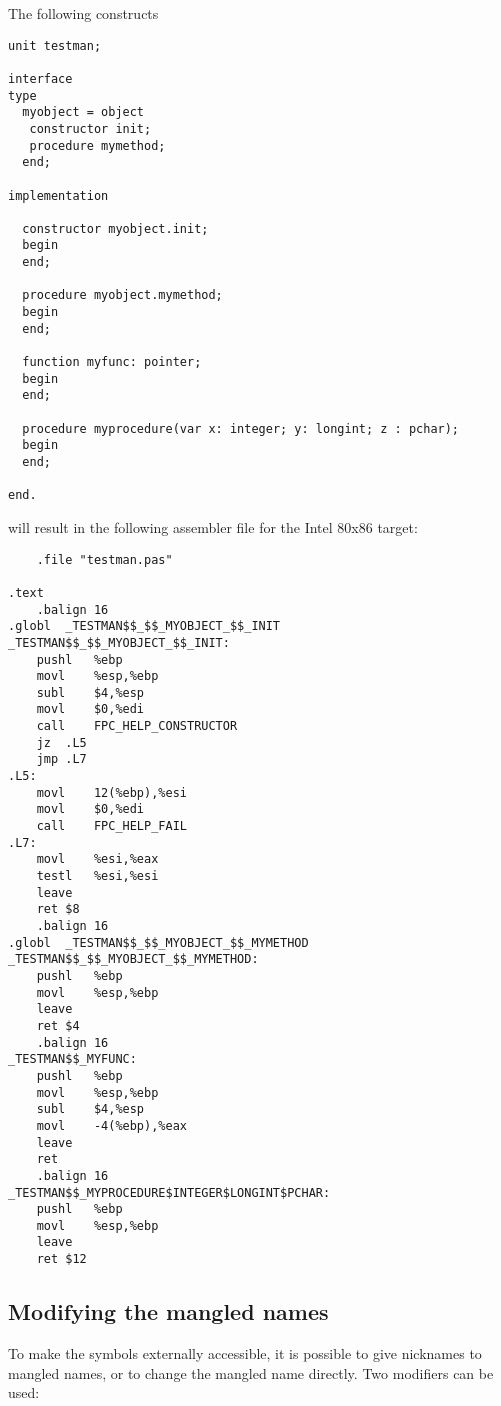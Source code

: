 The following constructs

\begin{verbatim}
unit testman;

interface
type
  myobject = object
   constructor init;
   procedure mymethod;
  end;

implementation

  constructor myobject.init;
  begin
  end;

  procedure myobject.mymethod;
  begin
  end;

  function myfunc: pointer;
  begin
  end;

  procedure myprocedure(var x: integer; y: longint; z : pchar);
  begin
  end;

end.

\end{verbatim}

will result in the following assembler file for the Intel 80x86 target:

\begin{verbatim}
	.file "testman.pas"

.text
	.balign 16
.globl	_TESTMAN$$_$$_MYOBJECT_$$_INIT
_TESTMAN$$_$$_MYOBJECT_$$_INIT:
	pushl	%ebp
	movl	%esp,%ebp
	subl	$4,%esp
	movl	$0,%edi
	call	FPC_HELP_CONSTRUCTOR
	jz	.L5
	jmp	.L7
.L5:
	movl	12(%ebp),%esi
	movl	$0,%edi
	call	FPC_HELP_FAIL
.L7:
	movl	%esi,%eax
	testl	%esi,%esi
	leave
	ret	$8
	.balign 16
.globl	_TESTMAN$$_$$_MYOBJECT_$$_MYMETHOD
_TESTMAN$$_$$_MYOBJECT_$$_MYMETHOD:
	pushl	%ebp
	movl	%esp,%ebp
	leave
	ret	$4
	.balign 16
_TESTMAN$$_MYFUNC:
	pushl	%ebp
	movl	%esp,%ebp
	subl	$4,%esp
	movl	-4(%ebp),%eax
	leave
	ret
	.balign 16
_TESTMAN$$_MYPROCEDURE$INTEGER$LONGINT$PCHAR:
	pushl	%ebp
	movl	%esp,%ebp
	leave
	ret	$12

\end{verbatim}

\subsection{Modifying the mangled names}

To make the symbols externally accessible, it is possible to
give nicknames to mangled names, or to change the mangled
name directly. Two modifiers can be used:

